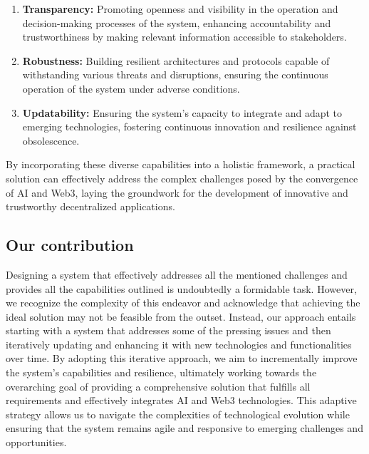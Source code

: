 \documentclass[conference]{IEEEtran}
\begin{document}
\begin{enumerate}
\item \textbf{Transparency:} Promoting openness and visibility in the operation and decision-making processes of the system, enhancing accountability and trustworthiness by making relevant information accessible to stakeholders.
\item \textbf{Robustness:} Building resilient architectures and protocols capable of withstanding various threats and disruptions, ensuring the continuous operation of the system under adverse conditions.
\item \textbf{Updatability:} Ensuring the system's capacity to integrate and adapt to emerging technologies, fostering continuous innovation and resilience against obsolescence.



\end{enumerate}

By incorporating these diverse capabilities into a holistic framework, a practical solution can effectively address the complex challenges posed by the convergence of AI and Web3, laying the groundwork for the development of innovative and trustworthy decentralized applications.

\subsection{Our contribution}

Designing a system that effectively addresses all the mentioned challenges and provides all the capabilities outlined is undoubtedly a formidable task. However, we recognize the complexity of this endeavor and acknowledge that achieving the ideal solution may not be feasible from the outset. Instead, our approach entails starting with a system that addresses some of the pressing issues and then iteratively updating and enhancing it with new technologies and functionalities over time. By adopting this iterative approach, we aim to incrementally improve the system's capabilities and resilience, ultimately working towards the overarching goal of providing a comprehensive solution that fulfills all requirements and effectively integrates AI and Web3 technologies. This adaptive strategy allows us to navigate the complexities of technological evolution while ensuring that the system remains agile and responsive to emerging challenges and opportunities.
\end{document}
